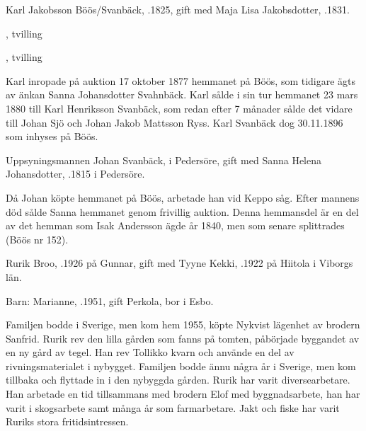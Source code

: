 Karl Jakobsson Böös/Svanbäck, .1825, gift med Maja Lisa Jakobsdotter, .1831.
\begin{jhchildren}
  \item {}, tvilling
  \item {}, tvilling
  \item {}
  \item {}
  \item {}
\end{jhchildren}
Karl inropade på auktion 17 oktober 1877 hemmanet på Böös, som tidigare ägts av änkan Sanna Johansdotter Svahnbäck. Karl sålde i sin tur hemmanet 23 mars 1880 till Karl Henriksson Svanbäck, som redan efter 7 månader sålde det vidare till Johan Sjö och Johan Jakob Mattsson Ryss. Karl Svanbäck dog 30.11.1896 som inhyses på Böös.


Uppsyningsmannen Johan Svanbäck,  i Pedersöre, gift med Sanna Helena Johansdotter, .1815 i Pedersöre.
\begin{jhchildren}
  \item {}
  \item {}
  \item {}
  \item {}
\end{jhchildren}
Då Johan köpte hemmanet på Böös, arbetade han vid Keppo såg. Efter mannens död sålde Sanna hemmanet genom frivillig auktion. Denna hemmansdel är en del av det hemman som Isak Andersson ägde år 1840, men som senare splittrades (Böös nr 152).




Rurik Broo, .1926 på Gunnar, gift med Tyyne Kekki, .1922 på Hiitola i Viborgs län.

Barn: Marianne, .1951, gift Perkola, bor i Esbo.


Familjen bodde i Sverige, men kom hem 1955, köpte Nykvist lägenhet av brodern Sanfrid. Rurik rev den lilla gården som fanns på tomten, påbörjade byggandet av en ny gård av tegel. Han rev Tollikko kvarn och använde en del av rivningsmaterialet i nybygget. Familjen bodde 		 ännu några år i Sverige, men kom tillbaka och flyttade in i den nybyggda gården. Rurik har varit diversearbetare. Han arbetade en tid tillsammans med brodern Elof med byggnadsarbete, han har varit i skogsarbete samt många år som farmarbetare. Jakt och fiske har varit Ruriks stora fritidsintressen.

